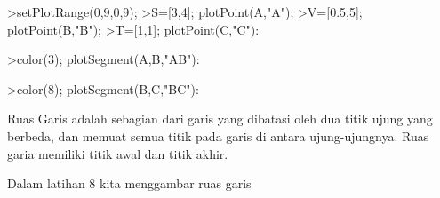 \documentclass[a4paper,10pt]{article}
\begin{document}
\begin{eulernotebook}
\begin{eulercomment}
\begin{eulercomment}
\begin{eulerprompt}
>setPlotRange(0,9,0,9);
>S=[3,4]; plotPoint(A,"A");
>V=[0.5,5]; plotPoint(B,"B");
>T=[1,1]; plotPoint(C,"C"):
\end{eulerprompt}
\begin{eulerprompt}
>color(3); plotSegment(A,B,"AB"):
\end{eulerprompt}
\begin{eulerprompt}
>color(8); plotSegment(B,C,"BC"):
\end{eulerprompt}
\begin{eulercomment}
Ruas Garis adalah sebagian dari garis yang dibatasi oleh dua titik
ujung yang berbeda, dan memuat semua titik pada garis di antara
ujung-ujungnya. Ruas garia memiliki titik awal dan titik akhir.

Dalam latihan 8 kita menggambar ruas garis


\end{eulercomment}
\end{eulercomment}
\end{eulercomment}
\end{eulernotebook}
\end{document}
